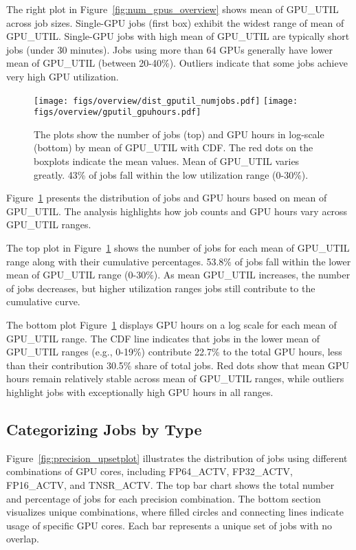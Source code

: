 The right plot in Figure~\ref{fig:num_gpus_overview} shows mean of GPU\_UTIL across job
sizes. Single-GPU jobs (first box) exhibit the widest range of mean of GPU\_UTIL.
Single-GPU jobs with high mean of GPU\_UTIL are
typically short jobs (under 30 minutes). Jobs using more than 64 GPUs generally
have lower mean of GPU\_UTIL (between 20-40\%). Outliers indicate
that some jobs achieve very high GPU utilization.

\begin{figure}[h]
    \centering
    \texttt{[image: figs/overview/dist\_gputil\_numjobs.pdf]}
    \texttt{[image: figs/overview/gputil\_gpuhours.pdf]}
    \caption{The plots show the number of jobs (top) and  GPU hours in log-scale
        (bottom) by mean of GPU\_UTIL with CDF. The red dots on the boxplots
        indicate the mean values. Mean of GPU\_UTIL varies greatly. 43\% of
        jobs fall within the low utilization range (0-30\%).}
    \label{fig:gputil_overview}
\end{figure}

Figure~\ref{fig:gputil_overview} presents the distribution of jobs and GPU
hours based on mean of GPU\_UTIL. The analysis highlights
how job counts and GPU hours vary across GPU\_UTIL ranges.

The top plot in Figure~\ref{fig:gputil_overview} shows the number of jobs
for each mean of GPU\_UTIL range along with their cumulative percentages.
53.8\% of jobs fall within the lower mean of GPU\_UTIL range (0-30\%). As mean
GPU\_UTIL increases, the number of jobs decreases, but higher utilization ranges
jobs still contribute to the cumulative curve.

The bottom plot Figure~\ref{fig:gputil_overview} displays GPU hours on a log
scale for each mean of
GPU\_UTIL range. The CDF line indicates that jobs in the lower mean of GPU\_UTIL
ranges (e.g., 0-19\%) contribute 22.7\% to the total GPU hours, less than their
contribution 30.5\% share of total jobs. Red dots show that
mean GPU hours remain relatively stable across mean of GPU\_UTIL ranges, while
outliers highlight jobs with exceptionally high
GPU hours in all ranges.

\subsection{Categorizing Jobs by Type}

Figure~\ref{fig:precision_upsetplot} illustrates the distribution of jobs
using different combinations of GPU cores,
including FP64\_ACTV, FP32\_ACTV, FP16\_ACTV, and TNSR\_ACTV.
The top bar chart shows the total number and percentage of jobs for each
precision combination. The bottom section visualizes unique combinations,
where filled circles and connecting lines indicate usage of specific GPU
cores. Each bar represents a unique set of jobs with no overlap.

